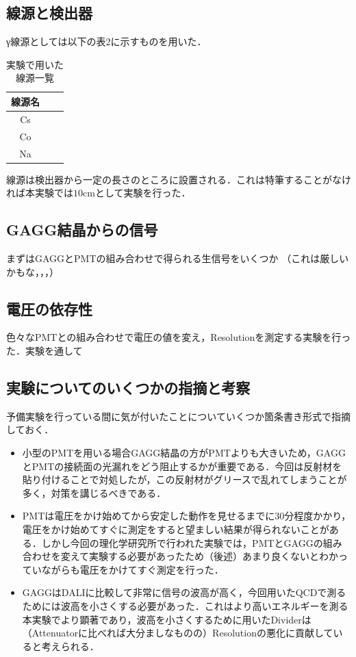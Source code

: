 \documentclass[a4j]{jarticle}
\begin{document}
\subsection{線源と検出器}
γ線源としては以下の表2に示すものを用いた．
  \begin{table}[htb]
  \centering
\begin{tabular}{|c|c|c|}
 線源名& & \\ \hline
 Cs& & \\
 Co& & \\
 Na& & \\
\end{tabular}
   \caption{実験で用いた線源一覧}
  \end{table}

線源は検出器から一定の長さのところに設置される．これは特筆することがなければ本実験では$10$cmとして実験を行った．


\subsection{GAGG結晶からの信号}
まずはGAGGとPMTの組み合わせで得られる生信号をいくつか
（これは厳しいかもな，，，）



\subsection{電圧の依存性}
色々なPMTとの組み合わせで電圧の値を変え，Resolutionを測定する実験を行った．実験を通して




\subsection{実験についてのいくつかの指摘と考察}
予備実験を行っている間に気が付いたことについていくつか箇条書き形式で指摘しておく．
\begin{itemize}
 \item 小型のPMTを用いる場合GAGG結晶の方がPMTよりも大きいため，GAGGとPMTの接続面の光漏れをどう阻止するかが重要である．今回は反射材を貼り付けることで対処したが，この反射材がグリースで乱れてしまうことが多く，対策を講じるべきである．
 \item PMTは電圧をかけ始めてから安定した動作を見せるまでに$30$分程度かかり，電圧をかけ始めてすぐに測定をすると望ましい結果が得られないことがある．しかし今回の理化学研究所で行われた実験では，PMTとGAGGの組み合わせを変えて実験する必要があったため（後述）あまり良くないとわかっていながらも電圧をかけてすぐ測定を行った．
 \item GAGGはDALIに比較して非常に信号の波高が高く，今回用いたQCDで測るためには波高を小さくする必要があった．これはより高いエネルギーを測る本実験でより顕著であり，波高を小さくするために用いたDividerは（Attenuatorに比べれば大分ましなものの）Resolutionの悪化に貢献していると考えられる．
\end{itemize}
\end{document}
